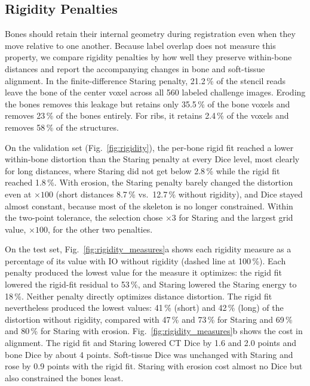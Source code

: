

\subsection{Rigidity Penalties}
\label{sect:res_rigidity}
Bones should retain their internal geometry during registration even when they move relative to one another.
Because label overlap does not measure this property, we compare rigidity penalties by how well they preserve within-bone distances and report the accompanying changes in bone and soft-tissue alignment.
In the finite-difference Staring penalty, 21.2\,\% of the stencil reads leave the bone of the center voxel across all 560 labeled challenge images.
Eroding the bones removes this leakage but retains only 35.5\,\% of the bone voxels and removes 23\,\% of the bones entirely.
For ribs, it retains 2.4\,\% of the voxels and removes 58\,\% of the structures.

On the validation set (Fig.~\ref{fig:rigidity}), the per-bone rigid fit reached a lower within-bone distortion than the Staring penalty at every Dice level, most clearly for long distances, where Staring did not get below 2.8\,\% while the rigid fit reached 1.8\,\%.
With erosion, the Staring penalty barely changed the distortion even at $\times100$ (short distances 8.7\,\% vs.\ 12.7\,\% without rigidity), and Dice stayed almost constant, because most of the skeleton is no longer constrained.
Within the two-point tolerance, the selection chose $\times3$ for Staring and the largest grid value, $\times100$, for the other two penalties.

On the test set, Fig.~\ref{fig:rigidity_measures}a shows each rigidity measure as a percentage of its value with IO without rigidity (dashed line at 100\,\%).
Each penalty produced the lowest value for the measure it optimizes: the rigid fit lowered the rigid-fit residual to 53\,\%, and Staring lowered the Staring energy to 18\,\%.
Neither penalty directly optimizes distance distortion.
The rigid fit nevertheless produced the lowest values: 41\,\% (short) and 42\,\% (long) of the distortion without rigidity, compared with 47\,\% and 73\,\% for Staring and 69\,\% and 80\,\% for Staring with erosion.
Fig.~\ref{fig:rigidity_measures}b shows the cost in alignment.
The rigid fit and Staring lowered CT Dice by 1.6 and 2.0 points and bone Dice by about 4 points.
Soft-tissue Dice was unchanged with Staring and rose by 0.9 points with the rigid fit.
Staring with erosion cost almost no Dice but also constrained the bones least.

